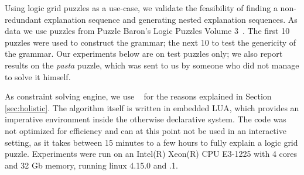 Using logic grid puzzles as a use-case, we validate the feasibility of finding a non-redundant explanation sequence and generating nested explanation sequences.
As data we use puzzles from Puzzle Baron’s Logic Puzzles Volume 3~\cite{logigrammen}.
The first 10 puzzles were used to construct the grammar; the next 10 to test the genericity of the grammar.
Our experiments below are on test puzzles only; we also report results on the \textit{pasta} puzzle, which was sent to us by someone who did not manage to solve it himself.

As constraint solving engine, we use \idp~\cite{IDP} for the reasons explained in Section \ref{sec:holistic}.
The algorithm itself is written in embedded LUA, which provides an imperative environment inside the otherwise declarative \idp system.
The code was not optimized for efficiency and can at this point not be used in an interactive setting, as it takes between 15 minutes to a few hours to fully explain a logic grid puzzle.
Experiments were run on an Intel(R) Xeon(R) CPU E3-1225 with 4 cores and 32 Gb memory, running linux 4.15.0 and .1.

